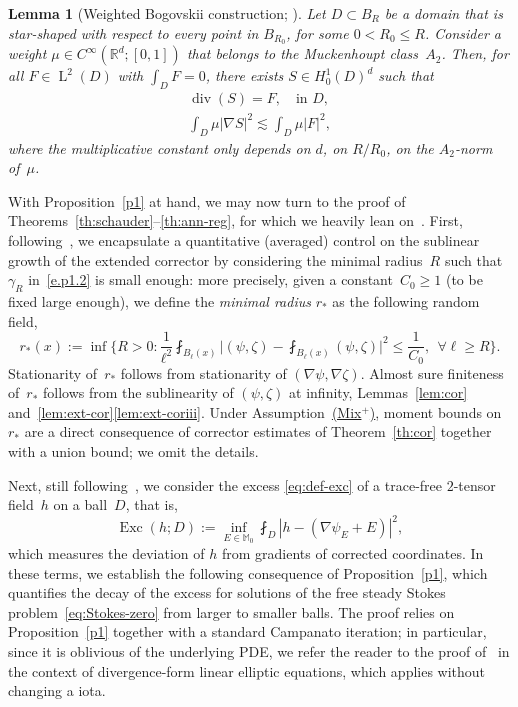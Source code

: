 \documentclass[10pt]{amsart}
\newcommand{\Mix}{\hyperref[Mix+]{\textup{(Mix$^+$)}}\xspace}
\theoremstyle{plain}
\newtheorem{lem}[theor]{Lemma}
\theoremstyle{definition}
\newcommand{\Exc}{\operatorname{Exc}}
\newcommand{\R}{\mathbb R}
\newcommand{\Md}{\mathbb M}
\newcommand{\Ld}{\operatorname{L}}
\newcommand{\Div}{{\operatorname{div}}}
\begin{document}
\begin{lem}[Weighted Bogovskii construction; \cite{DRS-10}]\label{lem:muck}
Let $D\subset B_R$ be a domain that is star-shaped with respect to every point in $B_{R_0}$, for some $0<R_0 \le R$.
Consider a weight $\mu\in C^\infty(\R^d;[0,1])$ that belongs to the Muckenhoupt class~$A_2$. Then, for all $F\in\Ld^2(D)$ with $\int_DF=0$, there exists $S\in H^1_0(D)^d$ such that
\begin{gather*}
\Div (S)=F,\quad\text{in $D$},\\
\int_D\mu|\nabla S|^2\lesssim \int_D\mu|F|^2,
\end{gather*}
where the multiplicative constant only depends on $d$, on $R/R_0$, on the $A_2$-norm of~$\mu$.
\end{lem}

With Proposition~\ref{p1} at hand, we may now turn to the proof of Theorems~\ref{th:schauder}--\ref{th:ann-reg}, for which we heavily lean on~\cite{GNO-reg,DO1}.
First, following~\cite{GNO-reg}, we encapsulate a quantitative (averaged) control on the sublinear growth of the extended corrector by considering the minimal radius~$R$ such that $\gamma_R$ in~\eqref{e.p1.2} is small enough:
more precisely, given a constant~$C_0\ge1$ (to be fixed large enough),
we define the \emph{minimal radius} $r_*$ as the following random field,
\begin{equation}\label{e.def-r*}
r_*(x):=\inf\bigg\{R>0 : \frac1{\ell^2} \fint_{B_\ell(x)} \Big|(\psi,\zeta)-\fint_{B_\ell(x)} (\psi,\zeta)\Big|^2 \le \frac1{C_0},~~\forall \ell\ge R \bigg\}.
\end{equation}
Stationarity of~$r_*$ follows from stationarity of $(\nabla\psi,\nabla\zeta)$.
Almost sure finiteness of~$r_*$ follows from the sublinearity of $(\psi,\zeta)$ at infinity, \cf Lemmas~\ref{lem:cor} and~\ref{lem:ext-cor}\eqref{lem:ext-coriii}. Under Assumption~\Mix, moment bounds on $r_*$ are a direct consequence of corrector estimates of Theorem~\ref{th:cor} together with a union bound; we omit the details.

Next, still following~\cite{GNO-reg}, we consider the excess \eqref{eq:def-exc} of a trace-free $2$-tensor field~$h$ on a ball~$D$, that is,
\begin{equation*}
\Exc(h;D):=\inf_{E\in \Md_0 }\fint_{D} |h-(\nabla\psi_E+E)|^2,
\end{equation*}
which measures the deviation of $h$ from gradients of corrected coordinates.
In these terms, we establish the following consequence of Proposition~\ref{p1}, which quantifies the decay of the excess for solutions of the free steady Stokes problem~\eqref{eq:Stokes-zero} from larger to smaller balls.
The proof relies on Proposition~\ref{p1} together with a standard Campanato iteration;
in particular, since it is oblivious of the underlying PDE, we refer the reader to the proof of~\cite[Th.\,1]{GNO-reg} in the context of divergence-form linear elliptic equations, which applies without changing a iota.
\end{document}
